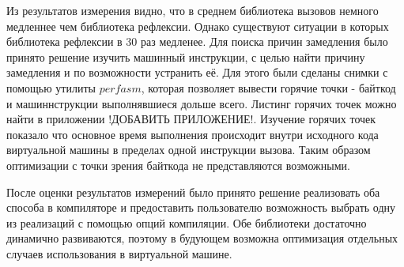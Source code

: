 Из результатов измерения видно, что в среднем библиотека вызовов немного медленнее чем библиотека рефлексии. Однако существуют ситуации в которых библиотека рефлексии в 30 раз медленее. Для поиска причин замедления было принято решение изучить машинный инструкции, с целью найти причину замедления и по возможности устранить её. Для этого были сделаны снимки с помощью утилиты $perfasm$, которая позволяет вывести горячие точки - байткод и машиннструкции выполнявшиеся дольше всего. Листинг горячих точек можно найти в приложении !ДОБАВИТЬ ПРИЛОЖЕНИЕ!. Изучение горячих точек показало что основное время выполнения происходит внутри исходного кода виртуальной машины в пределах одной инструкции вызова. Таким образом оптимизации с точки зрения байткода не представляются возможными.

После оценки результатов измерений было принято решение реализовать оба способа в компиляторе и предоставить пользователю возможность выбрать одну из реализаций с помощью опций компиляции. Обе библиотеки достаточно динамично развиваются, поэтому в будующем возможна оптимизация отдельных случаев использования в виртуальной машине.
